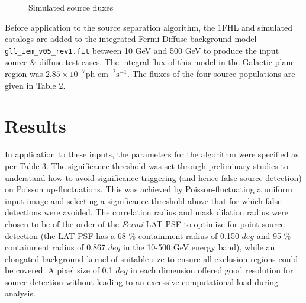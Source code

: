 \documentclass{PoS}
\begin{document}
\begin{figure}
\makeatletter
\def\@captype{table}
\makeatother
\caption{Simulated source fluxes}
\vspace{-30pt}
\end{figure}

Before application to the source separation algorithm, the 1FHL and simulated catalogs are added to the integrated Fermi Diffuse background model \verb|gll_iem_v05_rev1.fit| between 10 GeV and 500 GeV to produce the input source \& diffuse test cases. The integral flux of this model in the Galactic plane region was $2.85 \times 10^{-7} \text{ph cm}^{-2}\text{s}^{-1}$. The fluxes of the four source populations are given in Table 2.

\newpage
\section{Results}

In application to these inputs, the parameters for the algorithm were specified as per Table 3. The significance threshold was set through preliminary studies to understand how to avoid significance-triggering (and hence false source detection) on Poisson up-fluctuations. This was achieved by Poisson-fluctuating a uniform input image and selecting a significance threshold above that for which false detections were avoided. The correlation radius and mask dilation radius were chosen to be of the order of the \textit{Fermi}-LAT PSF to optimize for point source detection (the LAT PSF has a 68 \% containment radius of 0.150 $deg$ and 95 \% containment radius of 0.867 $deg$ in the 10-500 GeV energy band), while an elongated background kernel of suitable size to ensure all exclusion regions could be covered. A pixel size of 0.1 $deg$ in each dimension offered good resolution for source detection without leading to an excessive computational load during analysis.
\end{document}
